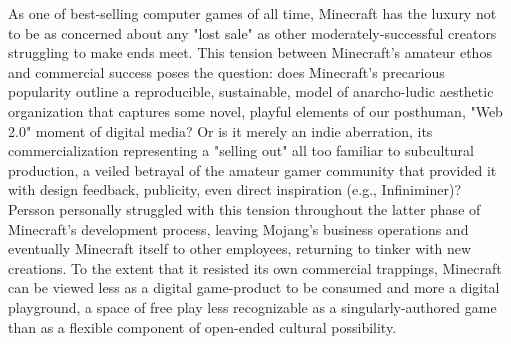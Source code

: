 As one of best-selling computer games of all time, Minecraft has the luxury not to be as concerned about any "lost sale" as other moderately-successful creators struggling to make ends meet. This tension between Minecraft's amateur ethos and commercial success poses the question: does Minecraft's precarious popularity outline a reproducible, sustainable, model of anarcho-ludic aesthetic organization that captures some novel, playful elements of our posthuman, "Web 2.0" moment of digital media? Or is it merely an indie aberration, its commercialization representing a "selling out" all too familiar to subcultural production, a veiled betrayal of the amateur gamer community that provided it with design feedback, publicity, even direct inspiration (e.g., Infiniminer)? Persson personally struggled with this tension throughout the latter phase of Minecraft's development process, leaving Mojang's business operations and eventually Minecraft itself to other employees, returning to tinker with new creations. To the extent that it resisted its own commercial trappings, Minecraft can be viewed less as a digital game-product to be consumed and more a digital playground, a space of free play less recognizable as a singularly-authored game than as a flexible component of open-ended cultural possibility.

